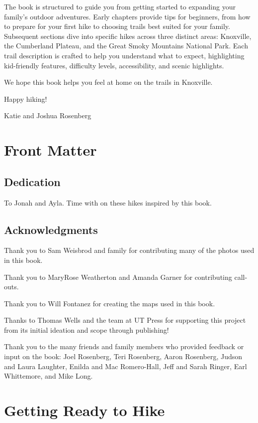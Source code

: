 \documentclass[
  letterpaper,
  DIV=11,
  numbers=noendperiod]{scrreprt}
\begin{document}
The book is structured to guide you from getting started to expanding
your family's outdoor adventures. Early chapters provide tips for
beginners, from how to prepare for your first hike to choosing trails
best suited for your family. Subsequent sections dive into specific
hikes across three distinct areas: Knoxville, the Cumberland Plateau,
and the Great Smoky Mountains National Park. Each trail description is
crafted to help you understand what to expect, highlighting kid-friendly
features, difficulty levels, accessibility, and scenic highlights.

We hope this book helps you feel at home on the trails in Knoxville.

Happy hiking!

Katie and Joshua Rosenberg

\part{Front Matter}

\chapter{Dedication}\label{dedication}

To Jonah and Ayla. Time with on these hikes inspired by this book.

\chapter{Acknowledgments}\label{acknowledgments}

Thank you to Sam Weisbrod and family for contributing many of the photos
used in this book.

Thank you to MaryRose Weatherton and Amanda Garner for contributing
call-outs.

Thank you to Will Fontanez for creating the maps used in this book.

Thanks to Thomas Wells and the team at UT Press for supporting this
project from its initial ideation and scope through publishing!

Thank you to the many friends and family members who provided feedback
or input on the book: Joel Rosenberg, Teri Rosenberg, Aaron Rosenberg,
Judson and Laura Laughter, Enilda and Mac Romero-Hall, Jeff and Sarah
Ringer, Earl Whittemore, and Mike Long.

\part{Getting Ready to Hike}
\end{document}

